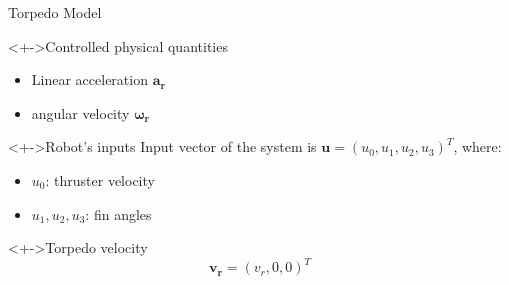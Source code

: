 \documentclass[10pt, xcolor={usenames, dvipsnames}]{beamer}
\begin{document}
        \begin{frame}{Torpedo Model}
            \begin{minipage}[c]{.48\textwidth}
                \vspace{-5mm}
                \begin{block}<+->{Controlled physical quantities}
                    \begin{itemize}
                        \item Linear acceleration $\mathbf{a_r}$
                        \item angular velocity $\mathbf{\omega_r}$
                    \end{itemize}
                \end{block}
            \end{minipage}
            \hfill
            \begin{minipage}[c]{.48\textwidth}
                \begin{block}<+->{Robot's inputs}
                    \centering
                    Input vector of the system is $\mathbf{u} = (u_0, u_1, u_2, u_3)^T$, where:
                    \begin{itemize}
                        \item $u_0$: thruster velocity \\
                        \item $u_1, u_2, u_3$: fin angles
                    \end{itemize}
                \end{block}
                \begin{block}<+->{Torpedo velocity}
                    \begin{equation}
                        \mathbf{v_r} = (v_r, 0, 0)^T
                    \end{equation}
                \end{block}
            \end{minipage}
        \end{frame}
\end{document}
